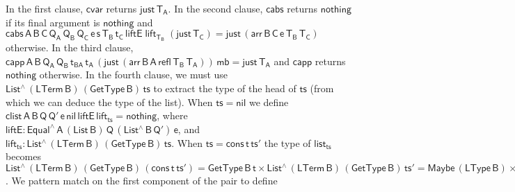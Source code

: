 \documentclass[9pt]{entcs}
\begin{document}
In the first clause, $\mathsf{cvar}$ returns $\mathsf{just\,T_A}$.  In
the second clause, $\mathsf{cabs}$ returns $\mathsf{nothing}$ if its
final argument is $\mathsf{nothing}$ and $\mathsf{cabs\, A \,B \,C
  \,Q_A\, Q_B \,Q_C\, e \,s \,T_B\, t_C\, liftE\;
lift_{T_B}\; (just \,T_C) = just \, (arr\, B\, C\, e\, T_B \,T_C)}$ otherwise.
In the third clause, $\mathsf{capp\, A \,B \, Q_A \, Q_B \, t_{BA}\,
  t_A \, (just \, (arr\, B \,A\, refl\, T_B\, T_A))\, mb = just\,
  T_A}$ and $\mathsf{capp}$ returns $\mathsf{nothing}$ otherwise.  In
the fourth clause, we must use $\mathsf{List^{\wedge}\, (LTerm\, B)\,
  (GetType\, B)\, ts}$ to extract the type of the head of
$\mathsf{ts}$ (from which we can deduce the type of the list). When
$\mathsf{ts} = \mathsf{nil}$ we define $\mathsf{clist\, A\, B\, Q\,
  Q'\, e\, nil \, liftE\, lift_{ts} = nothing}$, where $\mathsf{liftE
  : Equal^{\wedge}\, A\, (List\,B) \, Q\, (List^{\wedge}\, B\, Q')\,
  e}$, and $\mathsf{lift_{ts} : List^{\wedge}\, (LTerm\, B)\,
  (GetType\, B)\, ts}$.  When $\mathsf{ts} = \mathsf{cons\,t\,ts'}$
the type of $\mathsf{list_{ts}}$ becomes $\mathsf{List^{\wedge}\,
  (LTerm\, B)\, (GetType\, B)\, (cons\, t\, ts')} = \mathsf{GetType\,
  B\, t \times List^{\wedge}\, (LTerm\, B)\, (GetType\, B)\, ts'} =
\mathsf{Maybe\, (LType\, B) \times List^{\wedge}\, (LTerm\, B)\,
  (GetType\, B)\, ts'}$. We pattern match on the first component
of the pair to define
\end{document}
